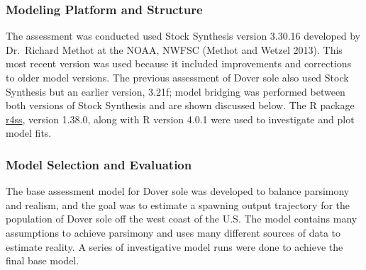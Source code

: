 \documentclass[11pt,
  english,
  a4paper,
]{article}
\begin{document}
\hypertarget{modeling-platform-and-structure}{%
\subsubsection{Modeling Platform and Structure}\label{modeling-platform-and-structure}}

\leavevmode\tagmcend\tagstructend


The assessment was conducted used Stock Synthesis version 3.30.16 developed by Dr.~Richard Methot at the NOAA, NWFSC {(Methot and Wetzel 2013)\leavevmode\tagmcend\tagstructend}. This most recent version was used because it included improvements and corrections to older model versions. The previous assessment of Dover sole also used Stock Synthesis but an earlier version, 3.21f; model bridging was performed between both versions of Stock Synthesis and are shown discussed below. The R package {\href{https://github.com/r4ss/r4ss}{r4ss}\leavevmode\tagmcend\tagstructend}, version 1.38.0, along with R version 4.0.1 were used to investigate and plot model fits.

\leavevmode\tagmcend\tagstructend\par


\hypertarget{model-selection-and-evaluation}{%
\subsubsection{Model Selection and Evaluation}\label{model-selection-and-evaluation}}

\leavevmode\tagmcend\tagstructend


The base assessment model for Dover sole was developed to balance parsimony and realism, and the goal was to estimate a spawning output trajectory for the population of Dover sole off the west coast of the U.S. The model contains many assumptions to achieve parsimony and uses many different sources of data to estimate reality. A series of investigative model runs were done to achieve the final base model.

\leavevmode\tagmcend\tagstructend\par

\end{document}
